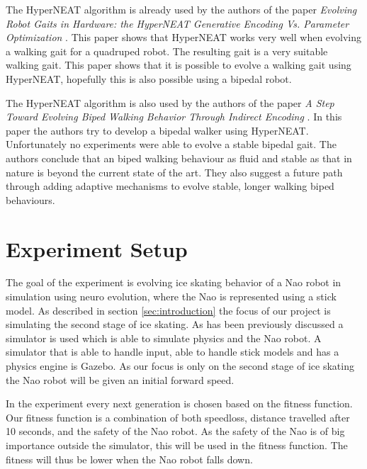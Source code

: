 \documentclass[10pt]{article}
\begin{document}
The HyperNEAT algorithm is already used by the authors of the paper \emph{Evolving Robot Gaits in Hardware: the HyperNEAT Generative Encoding Vs. Parameter Optimization} \cite{Yosinski2011EvolvedGaits}. This paper shows that HyperNEAT works very well when evolving a walking gait for a quadruped robot. The resulting gait is a very suitable walking gait. This paper shows that it is possible to evolve a walking gait using HyperNEAT, hopefully this is also possible using a bipedal robot.

The HyperNEAT algorithm is also used by the authors of the paper \emph{A Step Toward Evolving Biped Walking Behavior Through Indirect Encoding} \cite{steptowardevolvingbipedwalkingbehavior}. In this paper the authors try to develop a bipedal walker using HyperNEAT. Unfortunately no experiments were able to evolve a stable bipedal gait. The authors conclude that an biped walking behaviour as fluid and stable as that in nature is beyond the current state of the art. They also suggest a future path through adding adaptive mechanisms to evolve stable, longer walking biped behaviours. 

\section{Experiment Setup}
The goal of the experiment is evolving ice skating behavior of a Nao robot in simulation using neuro evolution, where the Nao is represented using a stick model. As described in section \ref{sec:introduction} the focus of our project is simulating the second stage of ice skating. As has been previously discussed a simulator is used which is able to simulate physics and the Nao robot. A simulator that is able to handle input, able to handle stick models and has a physics engine is Gazebo. As our focus is only on the second stage of ice skating the Nao robot will be given an initial forward speed. 
 
In the experiment every next generation is chosen based on the fitness function. Our fitness function is a combination of both speedloss, distance travelled after 10 seconds, and the safety of the Nao robot. As the safety of the Nao is of big importance outside the simulator, this will be used in the fitness function. The fitness will thus be lower when the Nao robot falls down.  

\end{document}
